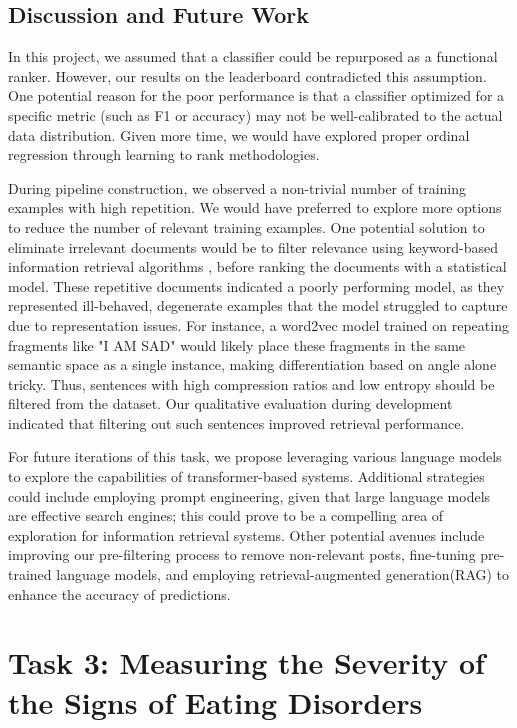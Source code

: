 \documentclass[]{style/ceurart}
\begin{document}
\subsection{Discussion and Future Work}

In this project, we assumed that a classifier could be repurposed as a functional ranker.
However, our results on the leaderboard contradicted this assumption.
One potential reason for the poor performance is that a classifier optimized for a specific metric (such as F1 or accuracy) may not be well-calibrated to the actual data distribution.
Given more time, we would have explored proper ordinal regression through learning to rank methodologies.

During pipeline construction, we observed a non-trivial number of training examples with high repetition.
We would have preferred to explore more options to reduce the number of relevant training examples.
One potential solution to eliminate irrelevant documents would be to filter relevance using keyword-based information retrieval algorithms \cite{robertson_probabilistic_2009}, before ranking the documents with a statistical model.
These repetitive documents indicated a poorly performing model, as they represented ill-behaved, degenerate examples that the model struggled to capture due to representation issues.
For instance, a word2vec model trained on repeating fragments like "I AM SAD" would likely place these fragments in the same semantic space as a single instance, making differentiation based on angle alone tricky.
Thus, sentences with high compression ratios and low entropy should be filtered from the dataset.
Our qualitative evaluation during development indicated that filtering out such sentences improved retrieval performance.

For future iterations of this task, we propose leveraging various language models to explore the capabilities of transformer-based systems.
Additional strategies could include employing prompt engineering, given that large language models are effective search engines; this could prove to be a compelling area of exploration for information retrieval systems.
Other potential avenues include improving our pre-filtering process to remove non-relevant posts, fine-tuning pre-trained language models, and employing retrieval-augmented generation(RAG) to enhance the accuracy of predictions.

\section{Task 3: Measuring the Severity of the Signs of Eating Disorders}
\end{document}
